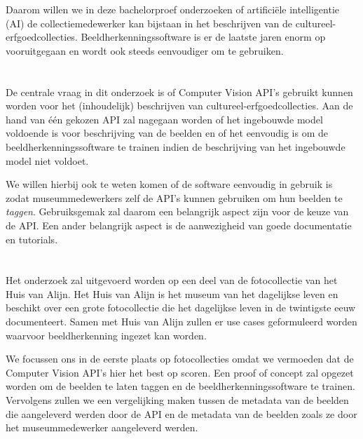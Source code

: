 Daarom willen we in deze bachelorproef onderzoeken of artificiële intelligentie (AI) de collectiemedewerker kan bijstaan in het beschrijven van de cultureel-erfgoedcollecties. Beeldherkenningssoftware is er de laatste jaren enorm op vooruitgegaan en wordt ook steeds eenvoudiger om te gebruiken.

\section{}
\label{sec:onderzoeksvraag}

De centrale vraag in dit onderzoek is of Computer Vision API’s gebruikt kunnen worden voor het (inhoudelijk) beschrijven van cultureel-erfgoedcollecties. Aan de hand van één gekozen API zal nagegaan worden of het ingebouwde model voldoende is voor beschrijving van de beelden en of het eenvoudig is om de beeldherkenningssoftware te trainen indien de beschrijving van het ingebouwde model niet voldoet. 

We willen hierbij ook te weten komen of de software eenvoudig in gebruik is zodat museummedewerkers zelf de API’s kunnen gebruiken om hun beelden te \textit{taggen}. Gebruiksgemak zal daarom een belangrijk aspect zijn voor de keuze van de API. Een ander belangrijk aspect is de aanwezigheid van goede documentatie en tutorials.

\section{}
\label{sec:onderzoeksdoelstelling}

Het onderzoek zal uitgevoerd worden op een deel van de fotocollectie van het Huis van Alijn. Het Huis van Alijn is het museum van het dagelijkse leven en beschikt over een grote fotocollectie die het dagelijkse leven in de twintigste eeuw documenteert. Samen met Huis van Alijn zullen er use cases geformuleerd worden waarvoor beeldherkenning ingezet kan worden.

We focussen ons in de eerste plaats op fotocollecties omdat we vermoeden dat de Computer Vision API’s hier het best op scoren. Een proof of concept zal opgezet worden om de beelden te laten taggen en de beeldherkenningssoftware te trainen. Vervolgens zullen we een vergelijking maken tussen de metadata van de beelden die aangeleverd werden door de API en de metadata van de beelden zoals ze door het museummedewerker aangeleverd werden.

